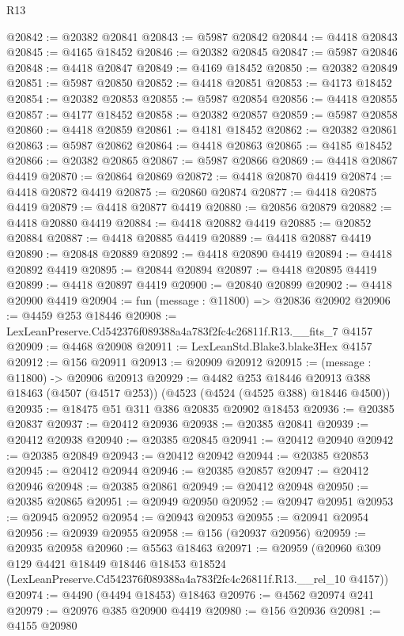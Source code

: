 \begin{lexlean}{R13}
\begin{coremodule}
@20842 := @20382 @20841
@20843 := @5987 @20842
@20844 := @4418 @20843
@20845 := @4165 @18452
@20846 := @20382 @20845
@20847 := @5987 @20846
@20848 := @4418 @20847
@20849 := @4169 @18452
@20850 := @20382 @20849
@20851 := @5987 @20850
@20852 := @4418 @20851
@20853 := @4173 @18452
@20854 := @20382 @20853
@20855 := @5987 @20854
@20856 := @4418 @20855
@20857 := @4177 @18452
@20858 := @20382 @20857
@20859 := @5987 @20858
@20860 := @4418 @20859
@20861 := @4181 @18452
@20862 := @20382 @20861
@20863 := @5987 @20862
@20864 := @4418 @20863
@20865 := @4185 @18452
@20866 := @20382 @20865
@20867 := @5987 @20866
@20869 := @4418 @20867 @4419
@20870 := @20864 @20869
@20872 := @4418 @20870 @4419
@20874 := @4418 @20872 @4419
@20875 := @20860 @20874
@20877 := @4418 @20875 @4419
@20879 := @4418 @20877 @4419
@20880 := @20856 @20879
@20882 := @4418 @20880 @4419
@20884 := @4418 @20882 @4419
@20885 := @20852 @20884
@20887 := @4418 @20885 @4419
@20889 := @4418 @20887 @4419
@20890 := @20848 @20889
@20892 := @4418 @20890 @4419
@20894 := @4418 @20892 @4419
@20895 := @20844 @20894
@20897 := @4418 @20895 @4419
@20899 := @4418 @20897 @4419
@20900 := @20840 @20899
@20902 := @4418 @20900 @4419
@20904 := fun (message : @11800) => @20836 @20902
@20906 := @4459 @253 @18446
@20908 := LexLeanPreserve.Cd542376f089388a4a783f2fc4c26811f.R13.__fits_7 @4157
@20909 := @4468 @20908
@20911 := LexLeanStd.Blake3.blake3Hex @4157
@20912 := @156 @20911
@20913 := @20909 @20912
@20915 := (message : @11800) -> @20906 @20913
@20929 := @4482
    @253
    @18446
    @20913
    @388
    @18463
    (@4507 (@4517 @253))
    (@4523 (@4524 (@4525 @388) @18446 @4500))
@20935 := @18475 @51 @311 @386 @20835 @20902 @18453
@20936 := @20385 @20837
@20937 := @20412 @20936
@20938 := @20385 @20841
@20939 := @20412 @20938
@20940 := @20385 @20845
@20941 := @20412 @20940
@20942 := @20385 @20849
@20943 := @20412 @20942
@20944 := @20385 @20853
@20945 := @20412 @20944
@20946 := @20385 @20857
@20947 := @20412 @20946
@20948 := @20385 @20861
@20949 := @20412 @20948
@20950 := @20385 @20865
@20951 := @20949 @20950
@20952 := @20947 @20951
@20953 := @20945 @20952
@20954 := @20943 @20953
@20955 := @20941 @20954
@20956 := @20939 @20955
@20958 := @156 (@20937 @20956)
@20959 := @20935 @20958
@20960 := @5563 @18463
@20971 := @20959
    (@20960
      @309
      @129
      @4421
      @18449
      @18446
      @18453
      @18524
      (LexLeanPreserve.Cd542376f089388a4a783f2fc4c26811f.R13.__rel_10 @4157))
@20974 := @4490 (@4494 @18453) @18463
@20976 := @4562 @20974 @241
@20979 := @20976 @385 @20900 @4419
@20980 := @156 @20936
@20981 := @4155 @20980

\end{coremodule}
\end{lexlean}
